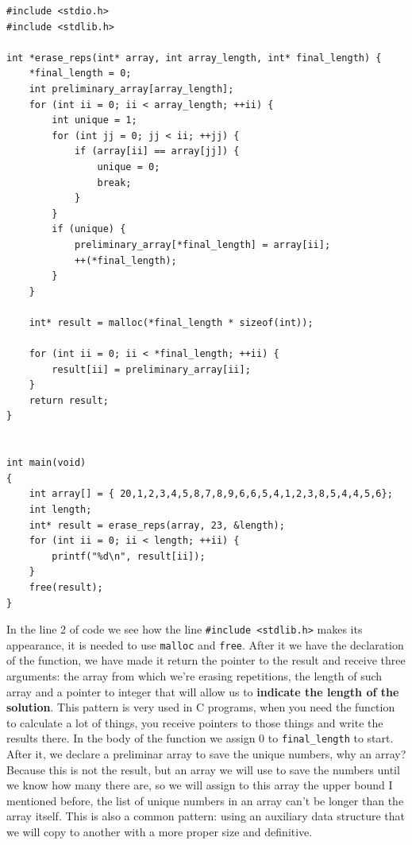 \documentclass[a4paper]{article}
\begin{document}
\noindent
\begin{minipage}[H]{\linewidth}
\mbox{}
\begin{lstlisting}[style=C, label={lst:mallocAndFree},
caption={Example of dynamic allocation}]
#include <stdio.h>
#include <stdlib.h>

int *erase_reps(int* array, int array_length, int* final_length) {
    *final_length = 0;
    int preliminary_array[array_length];
    for (int ii = 0; ii < array_length; ++ii) {
        int unique = 1;
        for (int jj = 0; jj < ii; ++jj) {
            if (array[ii] == array[jj]) {
                unique = 0;
                break;
            }
        }
        if (unique) {
            preliminary_array[*final_length] = array[ii];
            ++(*final_length);
        }
    }

    int* result = malloc(*final_length * sizeof(int));

    for (int ii = 0; ii < *final_length; ++ii) {
        result[ii] = preliminary_array[ii];
    }
    return result;
}


int main(void)
{
    int array[] = { 20,1,2,3,4,5,8,7,8,9,6,6,5,4,1,2,3,8,5,4,4,5,6};
    int length;
    int* result = erase_reps(array, 23, &length);
    for (int ii = 0; ii < length; ++ii) {
        printf("%d\n", result[ii]);
    }
    free(result);
}
\end{lstlisting}
\end{minipage}

In the line 2 of code we see how the line \verb!#include <stdlib.h>! makes its
appearance, it is needed to use \verb!malloc! and \verb!free!. After it we have
the declaration of the function, we have made it return the pointer to the
result and receive three arguments: the array from which we're erasing
repetitions, the length of such array and a pointer to integer that will allow
us to \textbf{indicate the length of the solution}. This pattern is very used in
C programs, when you need the function to calculate a lot of things, you receive
pointers to those things and write the results there. In the body of the
function we assign 0 to \verb!final_length! to start. After it, we declare a
preliminar array to save the unique numbers, why an array? Because this is not
the result, but an array we will use to save the numbers until we know how many
there are, so we will assign to this array the upper bound I mentioned before,
the list of unique numbers in an array can't be longer than the array itself.
This is also a common pattern: using an auxiliary data structure that we will
copy to another with a more proper size and definitive.
\end{document}
